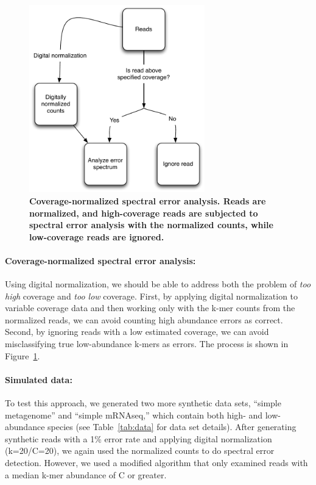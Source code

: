 \documentclass{article}
\begin{document}
\begin{figure}[!ht]
 \centerline{\includegraphics[width=3in]{./figures/coverage-aware-spectrum}}
\caption{{\bf Coverage-normalized spectral error analysis.  Reads are
    normalized, and high-coverage reads are subjected to spectral
    error analysis with the normalized counts, while low-coverage
    reads are ignored.}}
\label{fig:covaware}
\end{figure}

\paragraph{Coverage-normalized spectral error analysis:}

Using digital normalization, we should be able to address both the
problem of {\em too high} coverage and {\em too low} coverage.
First, by applying digital normalization to variable
coverage data and then working only with the k-mer counts from the
normalized reads, we can avoid counting high abundance errors as
correct.
Second, by ignoring reads with a low estimated coverage, we can
avoid misclassifying true low-abundance k-mers as errors.  The process
is shown in Figure~\ref{fig:covaware}.


\paragraph{Simulated data:}
To test this approach, we generated two more synthetic data sets,
``simple metagenome'' and ``simple mRNAseq,'' which contain both high-
and low-abundance species (see Table~\ref{tab:data} for data set
details).  After generating synthetic reads with a 1\% error rate and
applying digital normalization (k=20/C=20), we again used the normalized
counts to do spectral error detection.  However, we used a modified
algorithm that only examined reads with a median k-mer abundance of C
or greater.
\end{document}
